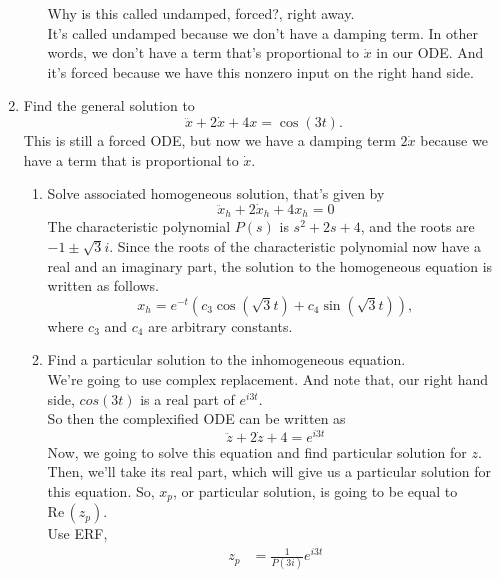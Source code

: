\begin{enumerate}[label=\textbf{Part.\arabic*}]
\begin{enumerate}[label=Step.\arabic*]
    Why is this called undamped, forced?, right away. \\
    It's called undamped because we don't have a damping term.
    In other words, we don't have a term that's proportional to $\dot{x}$ in our ODE.
    And it's forced because we have this nonzero input on the right hand side.
  \end{enumerate}
  \item Find the general solution to
  \begin{equation*}
    \ddot{x} + 2 \dot{x} + 4x = \cos (3t). 
  \end{equation*}
  This is still a forced ODE, but now we have a damping term $2 \dot{x}$
  because we have a term that is proportional to $\dot{x}$.
  \begin{enumerate}[label=Step.\arabic*]
  \item Solve associated homogeneous solution, that's given by \\
    \begin{equation*}
      \ddot{x}_ h + 2 \dot{x}_ h + 4 x_ h = 0
    \end{equation*}
    The characteristic polynomial $P(s)$ is $s^2 + 2 s + 4$,
    and the roots are $-1 \pm \sqrt{3} i$. 
    Since the roots of the characteristic polynomial now have a real and an imaginary part,
    the solution to the homogeneous equation is written as follows.
    \begin{equation*}
      x_ h = e^{-t} \left( c_ 3 \cos (\sqrt{3} t ) +  c_ 4 \sin (\sqrt{3} t )\right), 
    \end{equation*}
    where $c_ 3$ and $c_ 4$ are arbitrary constants.
  \item Find a particular solution to the inhomogeneous equation. \\
    We're going to use complex replacement.
    And note that, our right hand side, $cos (3t)$ is a real part of
    $e^{i3t}$. \\
    So then the complexified ODE can be written as
    \begin{equation*}
      \ddot{z} + 2 \dot{z} + 4 = e^{i3t}
    \end{equation*}
    Now, we going to solve this equation and find particular solution for $z$. 
    Then, we'll take its real part, which will give us a particular solution for this equation.
    So, $x_ p$, or particular solution, is going to be equal to $\mathrm{Re\, }(z_ p)$.\\
    Use ERF,
    \begin{align*}
      z_ p  &= \frac{1}{P(3i)} e^{i3t} \\

\end{align*}
\end{enumerate}
\end{enumerate}
